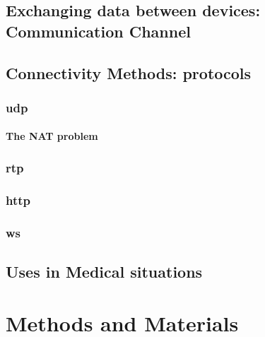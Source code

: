 \documentclass[hidelinks,11pt,a4paper,oneside,article]{memoir}
\numberwithin{equation}{chapter}
\begin{document}

\section{Exchanging data between devices: Communication Channel}
\section{Connectivity Methods: protocols}
\subsection{\gls{udp}}
\subsubsection{The NAT problem}
\subsection{\gls{rtp}}
\subsection{\gls{http}}
\cite{http-rfc}
\subsection{\gls{ws}}
\cite[p.~30]{rfc6455}

\section{Uses in Medical situations}



\chapter{Methods and Materials}
\end{document}
